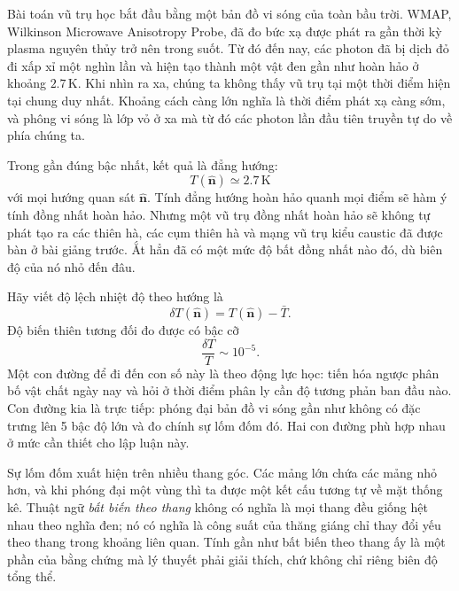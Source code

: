 Bài toán vũ trụ học bắt đầu bằng một bản đồ vi sóng của toàn bầu trời. WMAP, Wilkinson Microwave Anisotropy Probe, đã đo bức xạ được phát ra gần thời kỳ plasma nguyên thủy trở nên trong suốt. Từ đó đến nay, các photon đã bị dịch đỏ đi xấp xỉ một nghìn lần và hiện tạo thành một vật đen gần như hoàn hảo ở khoảng \(2.7\,\mathrm K\). Khi nhìn ra xa, chúng ta không thấy vũ trụ tại một thời điểm hiện tại chung duy nhất. Khoảng cách càng lớn nghĩa là thời điểm phát xạ càng sớm, và phông vi sóng là lớp vỏ ở xa mà từ đó các photon lần đầu tiên truyền tự do về phía chúng ta.

\begin{classroomqa}
\end{classroomqa}

Trong gần đúng bậc nhất, kết quả là đẳng hướng:
\[
T(\hat{\mathbf n})\simeq 2.7\,\mathrm K
\]
với mọi hướng quan sát \(\hat{\mathbf n}\). Tính đẳng hướng hoàn hảo quanh mọi điểm sẽ hàm ý tính đồng nhất hoàn hảo. Nhưng một vũ trụ đồng nhất hoàn hảo sẽ không tự phát tạo ra các thiên hà, các cụm thiên hà và mạng vũ trụ kiểu caustic đã được bàn ở bài giảng trước. Ắt hẳn đã có một mức độ bất đồng nhất nào đó, dù biên độ của nó nhỏ đến đâu.

Hãy viết độ lệch nhiệt độ theo hướng là
\[
\delta T(\hat{\mathbf n})=T(\hat{\mathbf n})-\bar T.
\]
Độ biến thiên tương đối đo được có bậc cỡ
\begin{equation}
\frac{\delta T}{T}\sim10^{-5}.
\label{eq:c10-cmb-anisotropy}
\end{equation}
Một con đường để đi đến con số này là theo động lực học: tiến hóa ngược phân bố vật chất ngày nay và hỏi ở thời điểm phân ly cần độ tương phản ban đầu nào. Con đường kia là trực tiếp: phóng đại bản đồ vi sóng gần như không có đặc trưng lên 5 bậc độ lớn và đo chính sự lốm đốm đó. Hai con đường phù hợp nhau ở mức cần thiết cho lập luận này.

Sự lốm đốm xuất hiện trên nhiều thang góc. Các mảng lớn chứa các mảng nhỏ hơn, và khi phóng đại một vùng thì ta được một kết cấu tương tự về mặt thống kê. Thuật ngữ \emph{bất biến theo thang} không có nghĩa là mọi thang đều giống hệt nhau theo nghĩa đen; nó có nghĩa là công suất của thăng giáng chỉ thay đổi yếu theo thang trong khoảng liên quan. Tính gần như bất biến theo thang ấy là một phần của bằng chứng mà lý thuyết phải giải thích, chứ không chỉ riêng biên độ tổng thể.

